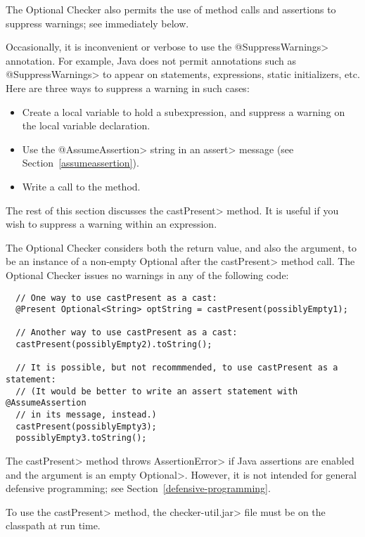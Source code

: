 The Optional Checker also permits the use of method calls and assertions to
suppress warnings; see immediately below.



Occasionally, it is inconvenient or
verbose to use the \<@SuppressWarnings> annotation.  For example, Java does
not permit annotations such as \<@SuppressWarnings> to appear on
statements, expressions, static initializers, etc.
Here are three ways to suppress a warning in such cases:
\begin{itemize}
\item
  Create a local variable to hold a subexpression, and
  suppress a warning on the local variable declaration.
\item
  Use the \<@AssumeAssertion> string in
  an \<assert> message (see Section~\ref{assumeassertion}).
\item
  Write a call to the
   method.
\end{itemize}

The rest of this section discusses the \<castPresent> method.
It is useful if you wish to suppress a warning within an expression.

The Optional Checker considers both the return value, and also the
argument, to be an instance of a non-empty Optional after the \<castPresent>
method call.
The Optional Checker issues no warnings in any of the following
code:

\begin{Verbatim}
  // One way to use castPresent as a cast:
  @Present Optional<String> optString = castPresent(possiblyEmpty1);

  // Another way to use castPresent as a cast:
  castPresent(possiblyEmpty2).toString();

  // It is possible, but not recommmended, to use castPresent as a statement:
  // (It would be better to write an assert statement with @AssumeAssertion
  // in its message, instead.)
  castPresent(possiblyEmpty3);
  possiblyEmpty3.toString();
\end{Verbatim}

  The \<castPresent> method throws \<AssertionError> if Java assertions are
  enabled and the argument is an empty \<Optional>.
  However, it is not intended for general defensive programming; see
  Section~\ref{defensive-programming}.

  To use the \<castPresent> method, the \<checker-util.jar> file
  must be on the classpath at run time.

